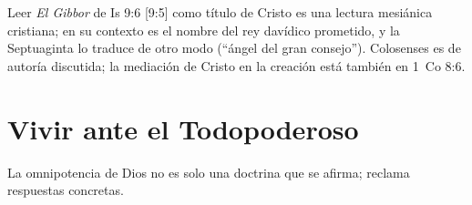 \documentclass[11pt,letterpaper]{article}
\begin{document}
\begin{nota}[Precisión]
Leer \emph{El Gibbor} de Is 9:6 [9:5] como título de Cristo es una lectura mesiánica cristiana; en su contexto es el nombre del rey davídico prometido, y la Septuaginta lo traduce de otro modo (``ángel del gran consejo''). Colosenses es de autoría discutida; la mediación de Cristo en la creación está también en 1~Co 8:6.
\end{nota}

\section{Vivir ante el Todopoderoso}

La omnipotencia de Dios no es solo una doctrina que se afirma; reclama respuestas concretas.
\end{document}
